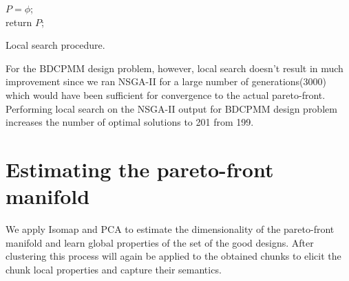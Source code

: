\begin{algorithm}
  $P = \phi$;\\
  return $P$;
  \BlankLine
  \caption{Local search procedure.}
  \label{localsearch}
\end{algorithm}

For the BDCPMM design problem, however, local search doesn't result in much
improvement since we ran NSGA-II for a large number of generations(3000)
which would have been sufficient for convergence to the actual
pareto-front. Performing local search on the NSGA-II output for BDCPMM
design problem increases the number of optimal solutions to 201 from 199.

\section{Estimating the pareto-front manifold}
We apply Isomap and PCA to estimate the dimensionality of the pareto-front
manifold and learn global properties of the set of the good designs. After
clustering this process will again be applied to the obtained chunks to
elicit the chunk local properties and capture their semantics.

  
